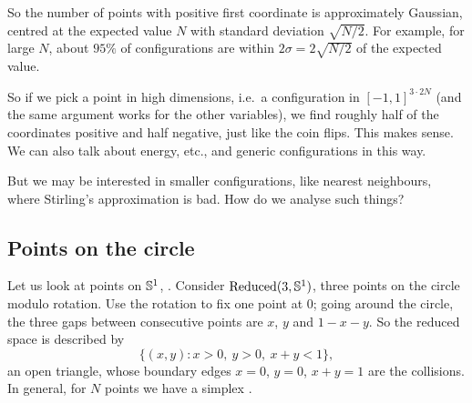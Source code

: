 So the number of points with positive first coordinate is approximately Gaussian, centred
at the expected value $N$ with standard deviation $\sqrt{N/2}$. For example, for large $N$,
about $95\%$ of configurations are within $2\sigma=2\sqrt{N/2}$ of the expected value.

\begin{remark}
\end{remark}

So if we pick a point in high dimensions, i.e.\ a configuration in
$[-1,1]^{3\cdot 2N}$
(and the same argument works for the other variables), we find roughly half of the
coordinates positive and half negative, just like the coin flips. This makes sense.
We can also talk about energy, etc., and generic configurations in this way.

But we may be interested in smaller configurations, like nearest neighbours, where
Stirling's approximation is bad.
How do we analyse such things?

\subsection{Points on the circle}
\label{L07:subsec:circle}

Let us look at points on $\mathbb{S}^1$, . Consider
$\operatorname{Reduced}(3,\mathbb{S}^1)$, three points on the circle modulo rotation. Use the
rotation to fix one point at $0$; going around the circle, the three gaps between
consecutive points are $x$, $y$ and $1-x-y$.
So the reduced space is described by
\[
  \{(x,y): x>0,\ y>0,\ x+y<1\},
\]
an open triangle, whose boundary edges $x=0$, $y=0$, $x+y=1$ are the collisions.
In general, for $N$ points we have a simplex
.

